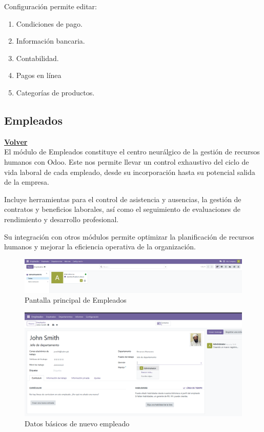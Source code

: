 \documentclass[a4paper,12pt]{article}
\begin{document}
Configuración permite editar:
\begin{enumerate}
    \item Condiciones de pago.
    \item Información bancaria.
    \item Contabilidad.
    \item Pagos en línea
    \item Categorías de productos.
\end{enumerate}

\clearpage

\subsection{Empleados}
\hyperlink{anchor-indice}{\textbf{Volver}}\\

El módulo de Empleados constituye el centro neurálgico de la gestión de recursos humanos con Odoo. Este nos permite llevar un control exhaustivo del ciclo de vida laboral de cada empleado, desde su incorporación hasta su potencial salida de la empresa.

Incluye herramientas para el control de asistencia y ausencias, la gestión de contratos y beneficios laborales, así como el seguimiento de evaluaciones de rendimiento y desarrollo profesional.

Su integración con otros módulos permite optimizar la planificación de recursos humanos y mejorar la eficiencia operativa de la organización.

\begin{figure}[h!]
    \centering
    \includegraphics[width=1\textwidth]{pr2odoo11-empleadosMain.png}
    \caption{Pantalla principal de Empleados}
\end{figure}
\FloatBarrier

\begin{figure}[h!]
    \centering
    \includegraphics[width=1\textwidth]{pr2odoo12-DatosBasicosDeNuevoEmpleado.png}
    \caption{Datos básicos de nuevo empleado}
\end{figure}
\FloatBarrier
\end{document}
